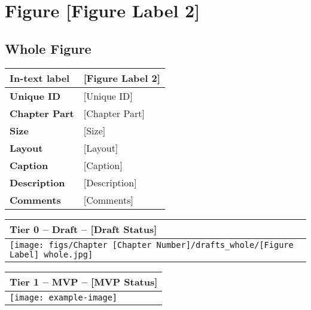 \clearpage

\section{Figure [Figure Label 2]} \label{sec_[Figure Label 2]}
\setcounter{subsection}{-1}

\small

\subsection{Whole Figure}

\begin{table}[h!] %
\centering
\small %
\sffamily %
\begin{tabular}{| m{4cm} | m{10cm} |}
    \hline
    \textbf{In-text label} & [Figure Label 2] \\
    \hline
    \textbf{Unique ID} & [Unique ID] \\
    \hline
    \textbf{Chapter Part} & [Chapter Part] \\
    \hline
    \textbf{Size} & [Size] \\
    \hline
    \textbf{Layout} & [Layout] \\
    \hline
    \textbf{Caption} & [Caption] \\
    \hline
    \textbf{Description} & [Description] \\
    \hline
    \textbf{Comments} & [Comments] \\
    \hline
    \end{tabular}
\end{table}

\begin{table}[h!] %
\centering
\small %
\sffamily %
\begin{tabular}{| m{14.5cm} |}
    \hline
    \textbf{Tier 0 -- Draft -- [Draft Status]}   \\
    \hline
    \hspace{5pt} \texttt{[image: figs/Chapter [Chapter Number]/drafts\_whole/[Figure Label] whole.jpg]} \\
    \hline
    \end{tabular}
\end{table}

\begin{table}[h!] %
\centering
\small %
\sffamily %
\begin{tabular}{| m{14.5cm} |}
    \hline
    \textbf{Tier 1 -- MVP -- [MVP Status]} \\
    \hline
    \hspace{5pt} \texttt{[image: example-image]} \\
    \hline
    \end{tabular}
\end{table}